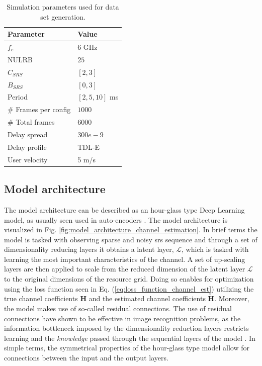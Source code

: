 \begin{table}[]
\centering
\begin{tabular}{l|l}
\toprule
\textbf{Parameter}                 & \textbf{Value} \\ \midrule
$f_c$ & $6$ GHz \\
NULRB         & $25$             \\
$C_{SRS}$   &  $[2,3]$               \\
$B_{SRS}$ & $[0,3]$ \\
Period & $[2, 5, 10]$ ms \\
\# Frames per config & $1000$ \\
\# Total frames & $6000$ \\
Delay spread  & $300e-9$         \\
Delay profile & TDL-E          \\
User velocity & 5 m/s         
\end{tabular}
\vspace{1em}
\caption{Simulation parameters used for data set generation.}
\label{tab:sim_param_channel_est}
\end{table}

\subsection{Model architecture}
The model architecture can be described as an hour-glass type Deep Learning model, as usually seen used in auto-encoders \cite{Nielsen2015}. The model architecture is visualized in Fig. \ref{fig:model_architecture_channel_estimation}. In brief terms the model is tasked with observing sparse and noisy \gls{srs} sequence and through a set of dimensionality reducing layers it obtains a latent layer, $\mathcal{L}$, which is tasked with learning the most important characteristics of the channel. A set of up-scaling layers are then applied to scale from the reduced dimension of the latent layer $\mathcal{L}$ to the original dimensions of the resource grid. Doing so enables for optimization using the loss function seen in Eq. (\ref{eq:loss_function_channel_est}) utilizing the true channel coefficients $\mathbf{H}$ and the estimated channel coefficients $\mathbf{\widetilde{H}}$. Moreover, the model makes use of so-called residual connections. The use of residual connections have shown to be effective in image recognition problems, as the information bottleneck imposed by the dimensionality reduction layers restricts learning and the \emph{knowledge} passed through the sequential layers of the model \cite{He2016DeepRecognition}. In simple terms, the symmetrical properties of the hour-glass type model allow for connections between the input and the output layers. 

